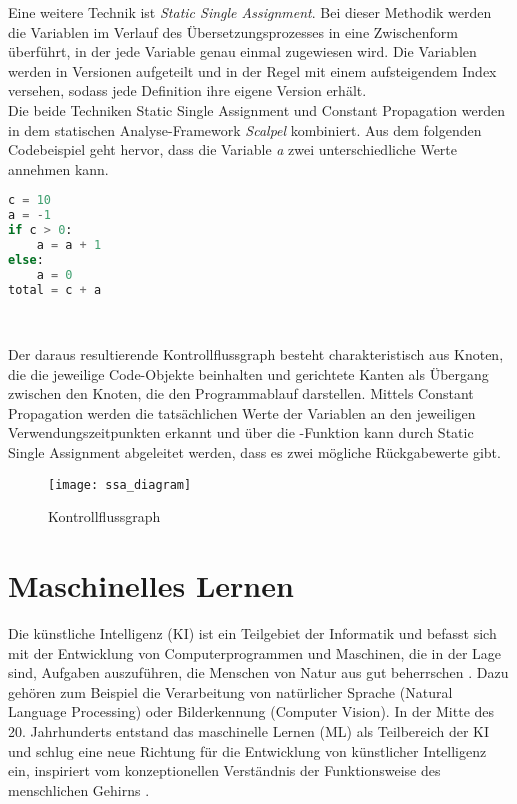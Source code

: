 \documentclass[german,bachelor]{swsLeipzig}
\begin{document}
Eine weitere Technik ist \textit{Static Single Assignment}.
Bei dieser Methodik werden die Variablen im Verlauf des Übersetzungsprozesses in eine Zwischenform überführt, in der jede Variable
genau einmal zugewiesen wird.
Die Variablen werden in Versionen aufgeteilt und in der Regel mit einem aufsteigendem Index versehen,
sodass jede Definition ihre eigene Version erhält.\\

Die beide Techniken Static Single Assignment und Constant Propagation werden in dem statischen Analyse-Framework
\textit{Scalpel} kombiniert.
Aus dem folgenden Codebeispiel geht hervor, dass die Variable \textit{a} zwei unterschiedliche Werte annehmen kann.\\

\begin{lstlisting}[language=Python, frame=single, basicstyle=\small]
c = 10
a = -1
if c > 0:
    a = a + 1
else:
    a = 0
total = c + a
\end{lstlisting}
\

Der daraus resultierende Kontrollflussgraph besteht charakteristisch aus Knoten, die die jeweilige Code-Objekte beinhalten und gerichtete Kanten als Übergang
zwischen den Knoten, die den Programmablauf darstellen.
Mittels Constant Propagation werden die tatsächlichen Werte der Variablen an den jeweiligen Verwendungszeitpunkten erkannt
und über die \textPhi-Funktion kann durch Static Single Assignment abgeleitet werden, dass es zwei mögliche Rückgabewerte gibt.

\begin{figure}[h]
 \centering
 \texttt{[image: ssa\_diagram]}
 \caption{Kontrollflussgraph \cite[]{li2022scalpel}}
 \label{fig:scalpel}
\end{figure}


\section{Maschinelles Lernen}
Die künstliche Intelligenz (KI) ist ein Teilgebiet der Informatik und befasst sich mit der Entwicklung von Computerprogrammen und Maschinen,
die in der Lage sind, Aufgaben auszuführen, die Menschen von Natur aus gut beherrschen \cite[S. 1]{2020}.
Dazu gehören zum Beispiel die Verarbeitung von natürlicher Sprache (Natural Language Processing) oder Bilderkennung (Computer Vision).
In der Mitte des 20. Jahrhunderts entstand das maschinelle Lernen (ML) als Teilbereich der KI und schlug eine neue Richtung
für die Entwicklung von künstlicher Intelligenz ein, inspiriert vom konzeptionellen Verständnis der Funktionsweise des menschlichen Gehirns \cite[S. 1]{2020}.\\
\end{document}
